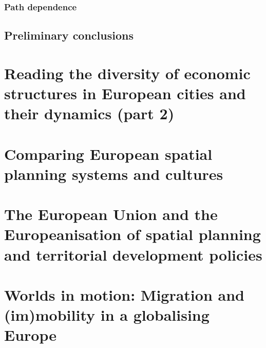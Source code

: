 \documentclass{article}
\begin{document}
\begin{outline}
	\1
\end{outline}

\subsubsection{Path dependence}


\begin{outline}
	\1
\end{outline}

\subsection{Preliminary conclusions}





\section{Reading the diversity of economic structures in European cities and their dynamics (part 2)}
\date{October 25th, 2021}


\section{Comparing European spatial planning systems and cultures}
\date{November 8th, 2021}



\section{The European Union and the Europeanisation of spatial planning and territorial development policies}
\date{November 9th, 2021}


\section{Worlds in motion: Migration and (im)mobility in a globalising Europe}
\date{November 22nd, 2021}
\end{document}
